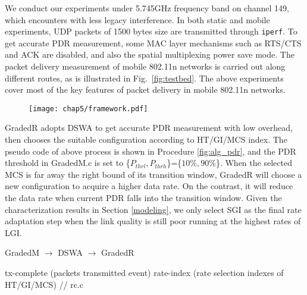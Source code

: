 We conduct our experiments under 5.745GHz frequency band on channel 149, which encounters with less legacy interference. In both static and mobile experiments, UDP packets of 1500 bytes size are transmitted through \texttt{iperf}. To get accurate PDR measurement, some MAC layer mechanisms such as RTS/CTS and ACK are disabled, and also the spatial multiplexing power save mode. The packet delivery measurement of mobile 802.11n networks is carried out along different routes, as is illustrated in Fig.~\ref{fig:testbed}. The above experiments cover most of the key features of packet delivery in mobile 802.11n networks.


\begin{figure}[!htp]
\centering
\texttt{[image: chap5/framework.pdf]}
\end{figure}

GradedR adopts DSWA to get accurate PDR measurement with low overhead, then chooses the suitable configuration according to HT/GI/MCS index. The pseudo code of above process is shown in Procedure \ref{fig:alg_pdr}, and the PDR threshold in GradedM.c is set to \{$P_{thrl},P_{thrh}$\}=\{$10\%,90\%$\}. When the selected MCS is far away the right bound of its transition window, GradedR will choose a new configuration to acquire a higher data rate. On the contrast, it will reduce the data rate when current PDR falls into the transition window. Given the characterization results in Section \ref{modeling}, we only select SGI as the final rate adaptation step when the link quality is still poor running at the highest rates of LGI.

\begin{algorithm}[!htp]
\renewcommand{\algorithmicrequire}{\textbf{Input:}}
\renewcommand{\algorithmicensure}{\textbf{Output:}}
\caption{GradedM $\rightarrow$ DSWA $\rightarrow$ GradedR}
\label{alg_pdr}
\begin{algorithmic}[1]
\Require tx-complete (packets transmitted event)
\Ensure  rate-index (rate selection indexes of HT/GI/MCS)
 // rc.c
\EndIf
{}
\EndIf
\State {}
\end{algorithmic}
\end{algorithm}

